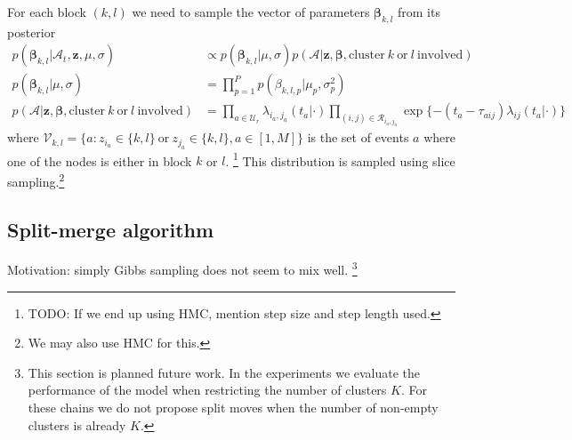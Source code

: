 \documentclass{article}
\begin{document}
For each block $(k,l)$ we need to sample the vector of parameters $\boldsymbol{\beta}_{k,l}$ from its posterior
\begin{align*}
p(\boldsymbol{\beta}_{k,l} | \mathcal{A}_t, \textbf{z}, \mu, \sigma) &\propto p(\boldsymbol{\beta}_{k,l} | \mu, \sigma) p( \mathcal{A}| \textbf{z}, \boldsymbol{\beta}, \mbox{cluster} \ k \ \mbox{or} \ l \ \mbox{involved}) \\  
p(\boldsymbol{\beta}_{k,l} | \mu, \sigma) &= \prod_{p=1}^Pp(\beta_{k,l,p}|\mu_p,\sigma_p^2)\\
p(\mathcal{A}|\mathbf{z},\boldsymbol{\beta}, \mbox{cluster} \ k \ \mbox{or} \ l \ \mbox{involved}) &= \prod_{a \in \mathcal{U}_r} \lambda_{i_a,j_a}(t_a|\cdot)
\prod_{(i,j) \in \mathcal{R}_{i_a,j_a}} \exp \{ -(t_a - \tau_{aij}) \lambda_{ij}(t_a|\cdot)\}
\end{align*}
where $\mathcal{V}_{k,l} = \{a: z_{i_a} \in \{k,l\} \ \mbox{or} \ z_{j_a} \in \{k,l\}, a \in [1,M]\}$ is the set of events $a$ where one of the nodes is either in block $k$ or $l$.  \footnote{TODO: If we end up using HMC, mention step size and step length used.}
This distribution is sampled using slice sampling.\footnote{We may also use HMC for this.}

\subsection{Split-merge algorithm}

Motivation: simply Gibbs sampling does not seem to mix well.  \footnote{This section is planned future work. In the experiments we evaluate the performance of the model when restricting the number of clusters $K$.  For these chains we do not propose split moves when the number of non-empty clusters is already $K$.}



\end{document}
